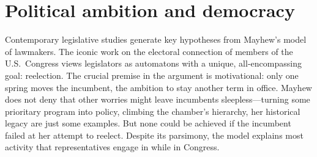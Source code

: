 \documentclass[letter,12pt]{article}
\begin{document}



\section{Political ambition and democracy}

\noindent Contemporary legislative studies generate key hypotheses from Mayhew's \citeyearpar{mayhew.1974} model of lawmakers. The iconic work on the electoral connection of members of the U.S.\ Congress views legislators as automatons with a unique, all-encompassing goal: reelection. The crucial premise in the argument is motivational: only one spring moves the incumbent, the ambition to stay another term in office. Mayhew does not deny that other worries might leave incumbents sleepless---turning some prioritary program into policy, climbing the chamber's hierarchy, her historical legacy are just some examples. But none could be achieved if the incumbent failed at her attempt to reelect. Despite its parsimony, the model explains most activity that representatives engage in while in Congress. 
\end{document}
